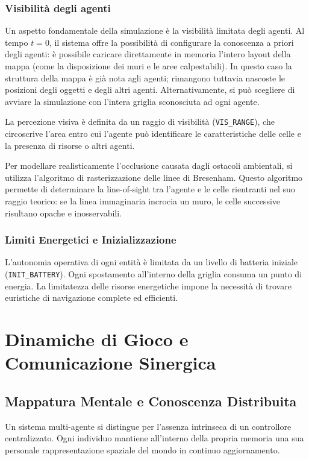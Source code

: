 \documentclass[12pt,a4paper]{report}
\begin{document}
\subsection{Visibilità degli agenti}
Un aspetto fondamentale della simulazione è la visibilità limitata degli agenti. Al tempo $t=0$, il sistema offre la possibilità di configurare la conoscenza a priori degli agenti: è possibile caricare direttamente in memoria l'intero layout della mappa (come la disposizione dei muri e le aree calpestabili). In questo caso la struttura della mappa è già nota agli agenti; rimangono tuttavia nascoste le posizioni degli oggetti e degli altri agenti. Alternativamente, si può scegliere di avviare la simulazione con l'intera griglia sconosciuta ad ogni agente.

La percezione visiva è definita da un raggio di visibilità (\texttt{VIS\_RANGE}), che circoscrive l'area entro cui l'agente può identificare le caratteristiche delle celle e la presenza di risorse o altri agenti. 

Per modellare realisticamente l'occlusione causata dagli ostacoli ambientali, si utilizza l'algoritmo di rasterizzazione delle linee di Bresenham. Questo algoritmo permette di determinare la line-of-sight tra l'agente e le celle rientranti nel suo raggio teorico: se la linea immaginaria incrocia un muro, le celle successive risultano opache e inosservabili.

\subsection{Limiti Energetici e Inizializzazione}
L'autonomia operativa di ogni entità è limitata da un livello di batteria iniziale (\texttt{INIT\_BATTERY}). Ogni spostamento all'interno della griglia consuma un punto di energia. La limitatezza delle risorse energetiche impone la necessità di trovare euristiche di navigazione complete ed efficienti.

\chapter{Dinamiche di Gioco e Comunicazione Sinergica}
\section{Mappatura Mentale e Conoscenza Distribuita}
Un sistema multi-agente si distingue per l'assenza intrinseca di un controllore centralizzato. Ogni individuo mantiene all'interno della propria memoria una sua personale rappresentazione spaziale del mondo in continuo aggiornamento. 
\end{document}
